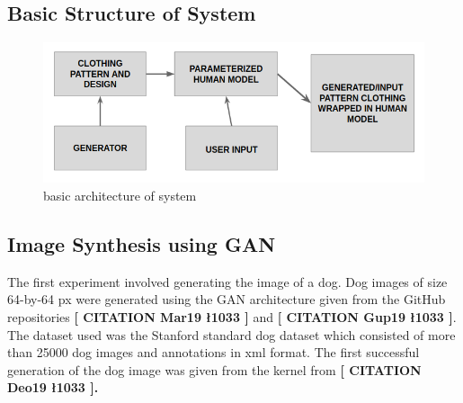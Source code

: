 \documentclass{article}
\begin{document}
    \subsection{Basic Structure of System}
        \begin{figure}[h]
            \centering
            \includegraphics[scale=0.75]{images/basicArchitecture.png}
            \caption{basic architecture of system}
        \end{figure}
    \blindtext
    
    \subsection{Image Synthesis using GAN}
    
    The first experiment involved generating the image of a dog. Dog images of size 64-by-64 px were generated using the GAN architecture given from the GitHub repositories \textbf{[ CITATION Mar19 \l 1033 ]} and \textbf{[ CITATION Gup19 \l 1033 ]}. The dataset used was the Stanford standard dog dataset which consisted of more than 25000 dog images and annotations in xml format. The first successful generation of the dog image was given from the kernel from \textbf{[ CITATION Deo19 \l 1033 ].}
    
\end{document}
